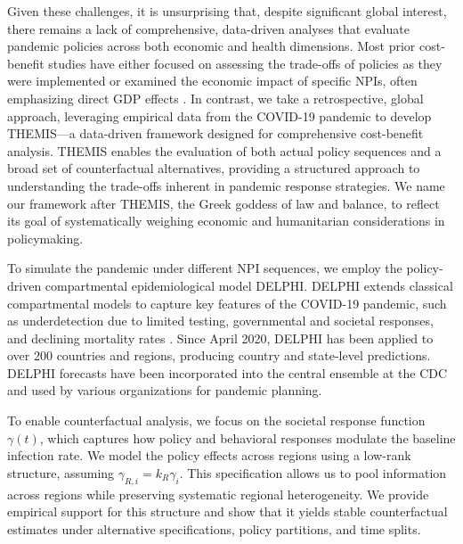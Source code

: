 \documentclass[msom,blindrev]{informs3} %
\newcommand{\rev}[1]{{\color{blue}#1}}
\begin{document}
Given these challenges, it is unsurprising that, despite significant global interest, there remains a lack of comprehensive, data-driven analyses that evaluate pandemic policies across both economic and health dimensions. Most prior cost-benefit studies have either focused on assessing the trade-offs of policies as they were implemented  or examined the economic impact of specific NPIs, often emphasizing direct GDP effects . In contrast, we take a retrospective, global approach, leveraging empirical data from the COVID-19 pandemic to develop THEMIS—a data-driven framework designed for comprehensive cost-benefit analysis. THEMIS enables the evaluation of both actual policy sequences and a broad set of counterfactual alternatives, providing a structured approach to understanding the trade-offs inherent in pandemic response strategies. We name our framework after THEMIS, the Greek goddess of law and balance, to reflect its goal of systematically weighing economic and humanitarian considerations in policymaking.

To simulate the pandemic under different NPI sequences, we employ the policy-driven compartmental epidemiological model DELPHI. DELPHI extends classical compartmental models to capture key features of the COVID-19 pandemic, such as underdetection due to limited testing, governmental and societal responses, and declining mortality rates . Since April 2020, DELPHI has been applied to over 200 countries and regions, producing country and state-level predictions. DELPHI forecasts have been incorporated into the central ensemble at the CDC and used by various organizations for pandemic planning.

\rev{To enable counterfactual analysis, we focus on the societal response function $\gamma(t)$, which captures how policy and behavioral responses modulate the baseline infection rate. We model the policy effects across regions using a low-rank structure, assuming $\gamma_{R,i} = k_R \gamma_i$. This specification allows us to pool information across regions while preserving systematic regional heterogeneity. We provide empirical support for this structure and show that it yields stable counterfactual estimates under alternative specifications, policy partitions, and time splits.  }
\end{document}
